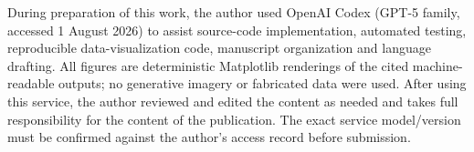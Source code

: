 \documentclass[11pt]{article}
\begin{document}
During preparation of this work, the author used OpenAI Codex (GPT-5 family,
accessed 1 August 2026) to assist source-code implementation, automated testing,
reproducible data-visualization code, manuscript organization and language
drafting. All figures are deterministic Matplotlib renderings of the cited
machine-readable outputs; no generative imagery or fabricated data were used.
After using this service, the author reviewed and edited the content as needed
and takes full responsibility for the content of the publication. The exact
service model/version must be confirmed against the author's access record
before submission.



\end{document}
